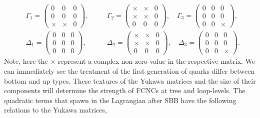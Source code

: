 \begin{equation}
\begin{aligned}
&\Gamma_1  = \begin{pmatrix}
0 & 0 & 0\\
0 & 0 & 0\\
\times & \times & 0
\end{pmatrix}, \quad 
&&\Gamma_2  = \begin{pmatrix}
\times & \times & 0\\
\times & \times & 0\\
0 & 0 & 0
\end{pmatrix}, \quad
\Gamma_3  = \begin{pmatrix}
0 & 0 & 0\\
0 & 0 & 0\\
0 & 0 & \times
\end{pmatrix}, \\[1em]
&\Delta_1  = \begin{pmatrix}
0 & 0 & 0\\
0 & 0 & 0\\
0 & 0 & 0
\end{pmatrix}, \quad 
&&\Delta_2 = \begin{pmatrix}
\times & \times & 0\\
\times & \times & 0\\
0 & 0 & 0
\end{pmatrix} , \quad 
\Delta_3 = \begin{pmatrix}
0 & 0 & 0\\
0 & 0 & 0\\
0 & 0 & \times
\end{pmatrix}. 
\end{aligned} 
\end{equation}
%
Note, here the $\times$ represent a complex non-zero value in the respective matrix. 
%
We can immediately see the treatment of the first generation of quarks differ between bottom and up types. 
%
%
These textures of the Yukawa matrices and the size of their components will determine the strength of FCNCs at tree and loop-levels. 
%
%
%
The quadratic terms that spawn in the Lagrangian after SBB have the following relations to the Yukawa matrices,

